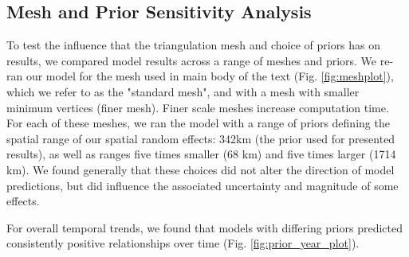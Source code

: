 \documentclass[11pt]{article}
\begin{document}
\subsection*{Mesh and Prior Sensitivity Analysis}\label{sec:priorsensitivity}
To test the influence that the triangulation mesh and choice of priors has on results, we compared model results across a range of meshes and priors. We re-ran our model for the mesh used in main body of the text (Fig. \ref{fig:meshplot}), which we refer to as the "standard mesh", and with a mesh with smaller minimum vertices (finer mesh). Finer scale meshes increase computation time. For each of these meshes, we ran the model with a range of priors defining the spatial range of our spatial random effects: 342km (the prior used for presented results), as well as ranges five times smaller (68 km) and five times larger (1714 km). We found generally that these choices did not alter the direction of model predictions, but did influence the associated uncertainty and magnitude of some effects.

For overall temporal trends, we found that models with differing priors predicted consistently positive relationships over time (Fig. \ref{fig:prior_year_plot}). 
\end{document}
